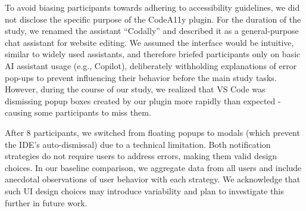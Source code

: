To avoid biasing participants towards adhering to accessibility guidelines, we did not disclose the specific purpose of the CodeA11y plugin. For the duration of the study, we renamed the assistant ``Codally'' and described it as a general-purpose chat assistant for website editing. We assumed the interface would be intuitive, similar to widely used assistants, and therefore briefed participants only on basic AI assistant usage (e.g., Copilot), deliberately withholding explanations of error pop-ups to prevent influencing their behavior before the main study tasks. However, during the course of our study, we realized that VS Code was dismissing popup boxes created by our plugin more rapidly than expected - causing some participants to miss them. \begin{highlight} After 8 participants, we switched from floating popups to modals (which prevent the IDE's auto-dismissal) due to a technical limitation. Both notification strategies do not require users to address errors, making them valid design choices. In our baseline comparison, we aggregate data from all users and include anecdotal observations of user behavior with each strategy. We acknowledge that such UI design choices may introduce variability and plan to investigate this further in future work.
\end{highlight} 
